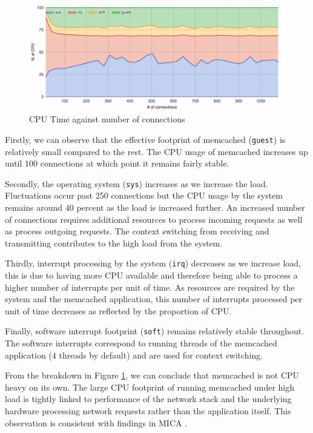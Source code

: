 \begin{figure}[h]
    \includegraphics[width=\textwidth]{./res/5_default_cpu.png}
    \caption{CPU Time against number of connections}
    \label{fig:memcached-default-cpu}
\end{figure}

Firstly, we can observe that the effective footprint of memcached (\texttt{guest}) is relatively small compared to the rest. The CPU usage of memcached increases up until 100 connections at which point it remains fairly stable.

Secondly, the operating system (\texttt{sys}) increases as we increase the load. Fluctuations occur past 250 connections but the CPU usage by the system remains around 40 percent as the load is increased further. An increased number of connections requires additional resources to process incoming requests as well as process outgoing requests. The context switching from receiving and transmitting contributes to the high load from the system.

Thirdly, interrupt processing by the system (\texttt{irq}) decreases as we increase load, this is due to having more CPU available and therefore being able to process a higher number of interrupts per unit of time. As resources are required by the system and the memcached application, this number of interrupts processed per unit of time decreases as reflected by the proportion of CPU.

Finally, software interrupt footprint (\texttt{soft}) remains relatively stable throughout. The software interrupts correspond to running threads of the memcached application (4 threads by default) and are used for context switching.

From the breakdown in Figure \ref{fig:memcached-default-cpu}, we can conclude that memcached is not CPU heavy on its own. The large CPU footprint of running memcached under high load is tightly linked to performance of the network stack and the underlying hardware processing network requests rather than the application itself. This observation is consistent with findings in MICA \cite{lim2014mica}.


